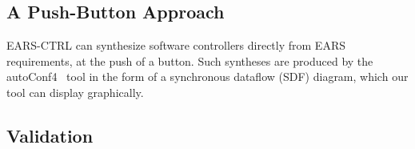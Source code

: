 \subsection{A Push-Button Approach}

\textsf{EARS-CTRL} can synthesize software controllers directly from EARS
requirements, at the push of a button. Such syntheses are produced 
by the \textsf{autoConf4}~\cite{autoCode17} tool in the form
of a synchronous dataflow (SDF) diagram, which our tool can display
graphically.\vspace{-.3cm}


\subsection{Validation}
\vspace{-.1cm}

